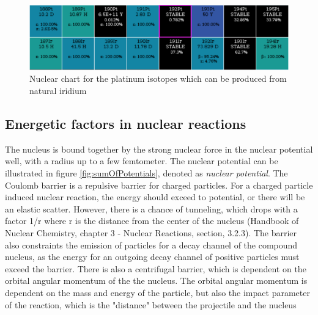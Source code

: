 \documentclass[a4paper,11pt,twoside]{book}
\begin{document}
\begin{figure}
    \centering
    \includegraphics[width=12cm]{Theory/Ir(d)Pt.png}
    \caption{Nuclear chart for the platinum isotopes which can be produced from natural iridium }
    \label{fig:chart_irpt}
\end{figure}



\subsection{Energetic factors in nuclear reactions}



The nucleus is bound together by the strong nuclear force in the nuclear potential well, with a radius up to a few femtometer. The nuclear potential can be illustrated in figure \ref{fig:sumOfPotentials}, denoted as \textit{nuclear potential}. The Coulomb barrier is a repulsive barrier for charged particles. For a charged particle induced nuclear reaction, the energy should exceed to potential, or there will be an elastic scatter. However, there is a chance of tunneling, which drops with a factor 1/r where r is the distance from the center of the nucleus (Handbook of Nuclear Chemistry, chapter 3 - Nuclear Reactions, section, 3.2.3). The barrier also constraints the emission of particles for a decay channel of the compound nucleus, as the energy for an outgoing decay channel of positive particles must exceed the barrier. There is also a centrifugal barrier, which is dependent on the orbital angular momentum of the the nucleus. The orbital angular momentum is dependent on the mass and energy of the particle, but also the impact parameter of the reaction, which is the "distance" between the projectile and the nucleus
\end{document}
